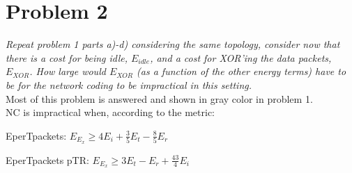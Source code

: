 \section{Problem 2}
\textit{Repeat problem 1 parts a)-d) considering the same topology, consider now that there is a cost for being idle, $E_{idle}$, and a cost for XOR'ing the data packets, $E_{XOR}$. How large would $E_{XOR}$ (as a function of the other energy terms) have to be for the network coding to be impractical in this setting.}\\

Most of this problem is answered and shown in gray color in problem 1.\\

NC is impractical when, according to the metric:
\begin{pitemize}
\item EperTpackets: $E_{E_{x}}\geq 4E_{i}+\frac{3}{5}E_{t}-\frac{8}{5}E_{r}$
\item EperTpackets pTR: $E_{E_{x}}\geq 3E_{t}-E_{r}+\frac{43}{4}E_{i}$
\end{pitemize}